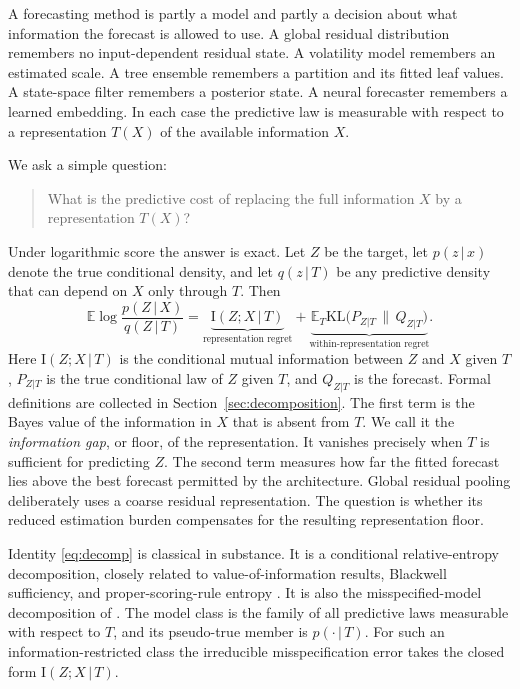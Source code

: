 \documentclass[11pt]{article}
\theoremstyle{remark}
\newcommand{\E}{\mathbb{E}}
\newcommand{\KL}{\mathrm{KL}}
\newcommand{\I}{\mathrm{I}}
\newcommand{\given}{\,|\,}
\begin{document}
A forecasting method is partly a model and partly a decision about what information the forecast
is allowed to use. A global residual distribution remembers no input-dependent residual state. A
volatility model remembers an estimated scale. A tree ensemble remembers a partition and its
fitted leaf values. A state-space filter remembers a posterior state. A neural forecaster
remembers a learned embedding. In each case the predictive law is measurable with respect to a
representation $T(X)$ of the available information $X$.

We ask a simple question:
\begin{quote}
What is the predictive cost of replacing the full information $X$ by a representation $T(X)$?
\end{quote}

Under logarithmic score the answer is exact. Let $Z$ be the target, let $p(z\given x)$ denote the
true conditional density, and let $q(z\given T)$ be any predictive density that can depend on $X$
only through $T$. Then
\begin{equation}\label{eq:decomp}
\E\log\frac{p(Z\given X)}{q(Z\given T)}
=\underbrace{\I(Z;X\given T)}_{\text{representation regret}}
+\underbrace{\E_T\KL\big(P_{Z|T}\,\|\,Q_{Z|T}\big)}_{\text{within-representation regret}} .
\end{equation}
Here $\I(Z;X\given T)$ is the conditional mutual information between $Z$ and $X$ given $T$,
$P_{Z|T}$ is the true conditional law of $Z$ given $T$, and $Q_{Z|T}$ is the forecast. Formal definitions are collected in
Section~\ref{sec:decomposition}. The first term is the Bayes
value of the information in $X$ that is absent from $T$. We call it the \emph{information
gap}, or floor, of the representation. It vanishes precisely when $T$ is
sufficient for predicting $Z$. The second term measures how far the fitted
forecast lies above the best forecast permitted by the architecture. Global residual pooling deliberately uses a coarse residual representation. The question is
whether its reduced estimation burden compensates for the resulting representation floor.

Identity \eqref{eq:decomp} is classical in substance. It is a conditional relative-entropy
decomposition, closely related to value-of-information results, Blackwell sufficiency, and
proper-scoring-rule entropy
\citep{lindley1956measure,degroot1962uncertainty,blackwell1953equivalent,grunwald2004game}. It
is also the misspecified-model decomposition of \citet{white1982maximum}. The model class is
the family of all predictive laws measurable with respect to $T$, and its pseudo-true member
is $p(\cdot\given T)$. For such an information-restricted class the irreducible
misspecification error takes the closed form $\I(Z;X\given T)$.
\end{document}
